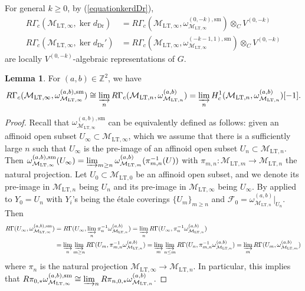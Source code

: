 \documentclass{article}
\theoremstyle{definition}
\newtheorem{lemma}[theorem]{Lemma}
\def\calF{\mathcal{F}}
\def\calM{\mathcal{M}}
\def\bbZ{\mathbb{Z}}
\def\isom{\cong}
\newcommand{\dlim}{\varinjlim}
\def\LT{\mathrm{LT}}
\def\sm{\mathrm{sm}}
\def\Dr{\mathrm{Dr}}
\begin{document}
For general $k\geq 0$, by (\ref{equationkerdDr}), 
\begin{align}\label{equationRGammackerdDrlocallyalgebraic}
    R\Gamma_c(\calM_{\LT,\infty},\ker d_{\Dr})&=R\Gamma_c(\calM_{\LT,\infty},\omega_{\calM_{\LT,\infty}}^{(0,-k),\sm})\otimes_C V^{(0,-k)}\\
    R\Gamma_c(\calM_{\LT,\infty},\ker d_{\Dr}')&=R\Gamma_c(\calM_{\LT,\infty},\omega_{\calM_{\LT,\infty}}^{(-k-1,1),\sm})\otimes_C V^{(0,-k)}    
\end{align} 
are locally $V^{(0,-k)}$-algebraic representations of $G$. 

\begin{lemma}\label{lem:RpOLTsm}
For $(a,b)\in\bbZ^2$, we have 
\begin{align*}
    R\Gamma_c(\calM_{\LT,\infty},\omega_{\calM_{\LT,\infty}}^{(a,b),\sm})\isom \dlim_n R\Gamma_c(\calM_{\LT,n},\omega^{(a,b)}_{\calM_{\LT,n}})=\dlim_n H^1_c(\calM_{\LT,n},\omega^{(a,b)}_{\calM_{\LT,n}})[-1].
\end{align*}
\begin{proof}
Recall that $\omega_{\calM_{\LT,\infty}}^{(a,b),\sm}$ can be equivalently defined as follows: given an affinoid open subset $U_\infty\subset \calM_{\LT,\infty}$, which we assume that there is a sufficiently large $n$ such that $U_\infty$ is the pre-image of an affinoid open subset $U_n\subset \calM_{\LT,n}$. Then $\omega_{\calM_{\LT,\infty}}^{(a,b),\sm}(U_{\infty})=\dlim_{m\ge n} \omega_{\calM_{\LT,m}}^{(a,b)}(\pi_{m,n}^{-1}(U))$ with $\pi_{m,n}:\calM_{\LT,m}\to \calM_{\LT,n}$ the natural projection. Let $U_0\subset \calM_{\LT,0}$ be an affinoid open subset, and we denote its pre-image in $\calM_{\LT,n}$ being $U_n$ and its pre-image in $\calM_{\LT,\infty}$ being $U_\infty$. By \cite[Proposition 14.9]{scholze2022etale} applied to $Y_0=U_n$ with $Y_i$'s being the \'etale coverings $\{U_m\}_{m\ge n}$ and $\calF_0=\omega_{\calM_{\LT,n}}^{(a,b)}|_{U_n}$. Then 
\begin{align*}
    R\Gamma(U_\infty,\omega_{\calM_{\LT,\infty}}^{(a,b),\sm})&=R\Gamma(U_\infty,\dlim_n \pi_n^{-1}\omega_{\calM_{\LT,n}}^{(a,b)})=\dlim_n R\Gamma(U_\infty,\pi_n^{-1}\omega_{\calM_{\LT,n}}^{(a,b)})\\
    &=\dlim_n\dlim_{m\ge n}R\Gamma(U_m,\pi_{m,n}^{-1}\omega_{\calM_{\LT,n}}^{(a,b)})= \dlim_m \dlim_{n\le m}R \Gamma(U_n,\pi_{m,n}^{-1}\omega_{\calM_{\LT,n}}^{(a,b)})=\dlim_m R\Gamma(U_m,\omega_{\calM_{\LT,m}}^{(a,b)})
\end{align*}
where $\pi_n$ is the natural projection $\calM_{\LT,\infty}\to \calM_{\LT,n}$. In particular, this implies that $R\pi_{0,*}\omega_{\calM_{\LT,\infty}}^{(a,b),\sm}\isom \dlim_nR\pi_{n,0,*}\omega_{\calM_{\LT,n}}^{(a,b)}$.


\end{proof}
\end{lemma}
\end{document}

